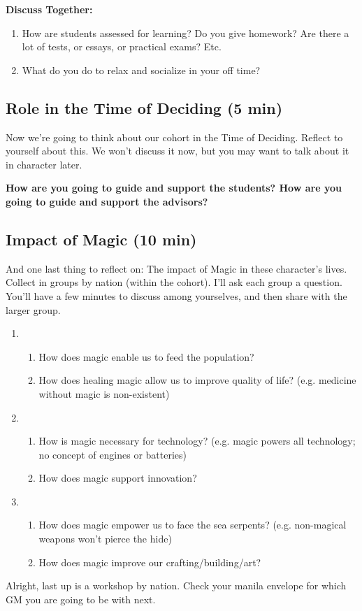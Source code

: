 \documentclass[green]{GL2020}
\begin{document}
\textbf{Discuss Together:}
\begin{enumerate}
	\item How are students assessed for learning? Do you give homework? Are there a lot of tests, or essays, or practical exams? Etc.
	\item What do you do to relax and socialize in your off time?
\end{enumerate}

\subsection*{Role in the Time of Deciding (5 min)}
Now we’re going to think about our cohort in the Time of Deciding. Reflect to yourself about this. We won't discuss it now, but you may want to talk about it in character later.

\textbf{How are you going to guide and support the students? How are you going to guide and support the advisors?}

\subsection*{Impact of Magic (10 min)}
And one last thing to reflect on: The impact of Magic in these character’s lives. Collect in groups by nation (within the cohort). I’ll ask each group a question. You’ll have a few minutes to discuss among yourselves, and then share with the larger group.
\begin{enumerate}
	\item \pFarm{}
	\begin{enumerate}
		\item How does magic enable us to feed the population?
		\item How does healing magic allow us to improve quality of life? (e.g. medicine without magic is non-existent)
	\end{enumerate}
	\item \pTech{}
	\begin{enumerate}
		\item How is magic necessary for technology? (e.g. magic powers all technology; no concept of engines or batteries)
		\item How does magic support innovation?
	\end{enumerate}
	\item \pShip{}
	\begin{enumerate}
		\item How does magic empower us to face the sea serpents? (e.g. non-magical weapons won’t pierce the hide)
		\item How does magic improve our crafting/building/art?
	\end{enumerate}
\end{enumerate}


Alright, last up is a workshop by nation. Check your manila envelope for which GM you are going to be with next.
\end{document}
